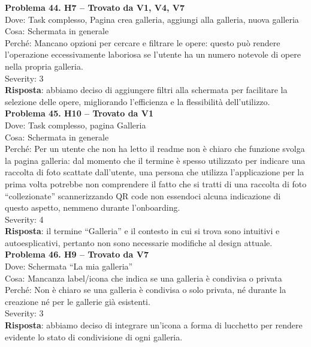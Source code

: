 \documentclass{article}
\begin{document}
\noindent \textbf{Problema 44. H7 – Trovato da V1, V4, V7} \\
Dove: Task complesso, Pagina crea galleria, aggiungi alla galleria, nuova galleria \\
Cosa: Schermata in generale \\
Perché: Mancano opzioni per cercare e filtrare le opere: questo può rendere l’operazione eccessivamente laboriosa se l’utente ha un numero notevole di opere nella propria galleria. \\
Severity: 3 \\
\textbf{Risposta}: abbiamo deciso di aggiungere filtri alla schermata per facilitare la selezione delle opere, migliorando l’efficienza e la flessibilità dell’utilizzo.\\

\noindent \textbf{Problema 45. H10 – Trovato da V1} \\
Dove: Task complesso, pagina Galleria \\
Cosa: Schermata in generale \\
Perché: Per un utente che non ha letto il readme non è chiaro che funzione svolga la pagina galleria: dal momento che il termine è spesso utilizzato per indicare una raccolta di foto scattate dall’utente, una persona che utilizza l’applicazione per la prima volta potrebbe non comprendere il fatto che si tratti di una raccolta di foto “collezionate” scannerizzando QR code non essendoci alcuna indicazione di questo aspetto, nemmeno durante l’onboarding. \\
Severity: 4 \\
\textbf{Risposta}: il termine “Galleria” e il contesto in cui si trova sono intuitivi e autoesplicativi, pertanto non sono necessarie modifiche al design attuale.\\

\noindent \textbf{Problema 46. H9 – Trovato da V7} \\
Dove: Schermata “La mia galleria” \\
Cosa: Mancanza label/icona che indica se una galleria è condivisa o privata \\
Perché: Non è chiaro se una galleria è condivisa o solo privata, né durante la creazione né per le gallerie già esistenti. \\
Severity: 3 \\
\textbf{Risposta}: abbiamo deciso di integrare un’icona a forma di lucchetto per rendere evidente lo stato di condivisione di ogni galleria.\\ \\
\end{document}
